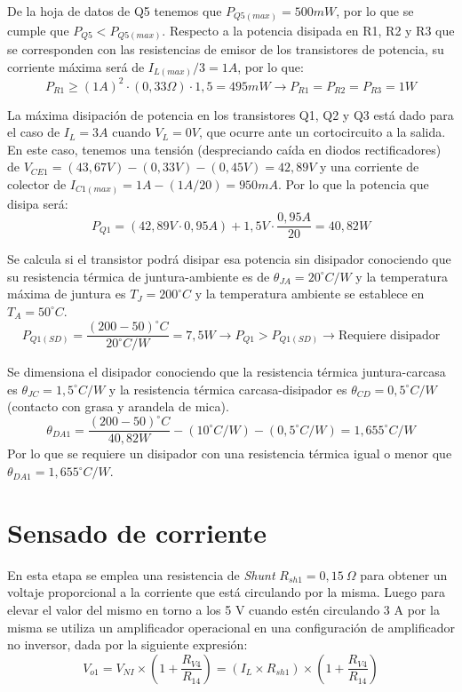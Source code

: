 De la hoja de datos de Q5 tenemos que $P_{Q5(max)}=500mW$, por lo que se cumple que $P_{Q5}<P_{Q5(max)}$. Respecto a la potencia disipada en R1, R2 y R3 que se corresponden con las resistencias de emisor de los transistores de potencia, su corriente máxima será de $I_{L(max)}/3=1A$, por lo que:
\begin{equation}
P_{R1}\geq (1A)^2\cdot (0,33\Omega)\cdot 1,5=495 mW \to P_{R1}=P_{R2}=P_{R3}=1W
\end{equation}\par 
La máxima disipación de potencia en los transistores Q1, Q2 y Q3 está dado para el caso de $I_L=3A$ cuando $V_L=0V$, que ocurre ante un cortocircuito a la salida. En este caso, tenemos una tensión (despreciando caída en diodos rectificadores) de $V_{CE1} = (43,67 V)-(0,33 V)-(0,45 V)=42,89 V$ y una corriente de colector de $I_{C1(max)}=1 A-(1A/20)=950mA$. Por lo que la potencia que disipa será:
\begin{equation}
P_{Q1}=(42,89V\cdot 0,95A)+1,5V\cdot \frac{0,95A}{20}=40,82 W
\end{equation}\par 
Se calcula si el transistor podrá disipar esa potencia sin disipador conociendo que su resistencia térmica de juntura-ambiente es de $\theta _{JA}=20^\circ C/W$ y la temperatura máxima de juntura es $T_J=200^\circ C$ y la temperatura ambiente se establece en $T_A=50^\circ C$.
\begin{equation}
P_{Q1(SD)}=\frac{(200-50)^\circ C}{20^\circ C/W}=7,5W \to P_{Q1}>P_{Q1(SD)} \to \text{Requiere disipador}
\end{equation} \par 
Se dimensiona el disipador conociendo que la resistencia térmica juntura-carcasa es $\theta_{JC}=1,5^\circ C/W$ y la resistencia térmica carcasa-disipador es $\theta_{CD}=0,5^\circ C/W$ (contacto con grasa y arandela de mica).
\begin{equation}
\theta_{DA1}=\frac{(200-50)^\circ C}{40,82 W}-(10^\circ C/W)-(0,5^\circ C/W)=1,655^\circ C/W
\end{equation}
Por lo que se requiere un disipador con una resistencia térmica igual o menor que $\theta_{DA1}=1,655^\circ C/W$.


\section{Sensado de corriente}
En esta etapa se emplea una resistencia de \textit{Shunt} $R_{sh1} =0,15~\Omega$ para obtener un voltaje proporcional a la corriente que está circulando por la misma. Luego para elevar el valor del mismo en torno a los 5 V cuando estén circulando 3 A por la misma se utiliza un amplificador operacional en una configuración de amplificador no inversor, dada por la siguiente expresión:
\begin{equation}
V_{o1} =V_{NI} \times (1+\frac{R_{V4} }{R_{14} })=(I_L \times R_{sh1} )\times (1+\frac{R_{V4} }{R_{14} })
\end{equation}\par 

